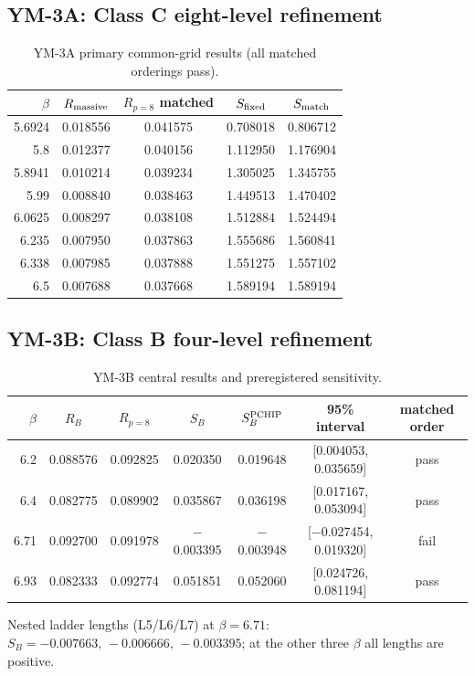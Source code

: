 \documentclass[11pt,a4paper]{article}
\theoremstyle{definition}
\theoremstyle{remark}
\begin{document}
\subsection{YM-3A: Class C eight-level refinement}
\begin{table}[ht]\centering\small\caption{YM-3A primary common-grid results (all matched orderings pass).}\label{tab:ym3a}
\begin{tabular}{@{}rcccc@{}}\toprule $\beta$ & $R_{\rm massive}$ & $R_{p=8}$ matched & $S_{\rm fixed}$ & $S_{\rm match}$\\\midrule
5.6924 & 0.018556 & 0.041575 & 0.708018 & 0.806712\\
5.8 & 0.012377 & 0.040156 & 1.112950 & 1.176904\\
5.8941 & 0.010214 & 0.039234 & 1.305025 & 1.345755\\
5.99 & 0.008840 & 0.038463 & 1.449513 & 1.470402\\
6.0625 & 0.008297 & 0.038108 & 1.512884 & 1.524494\\
6.235 & 0.007950 & 0.037863 & 1.555686 & 1.560841\\
6.338 & 0.007985 & 0.037888 & 1.551275 & 1.557102\\
6.5 & 0.007688 & 0.037668 & 1.589194 & 1.589194\\
\bottomrule\end{tabular}\end{table}
\subsection{YM-3B: Class B four-level refinement}
\begin{table}[ht]\centering\small\caption{YM-3B central results and preregistered sensitivity.}\label{tab:ym3b}
\begin{tabular}{@{}rcccccc@{}}\toprule $\beta$ & $R_B$ & $R_{p=8}$ & $S_B$ & $S_B^{\rm PCHIP}$ & 95\% interval & matched order\\\midrule
6.2 & 0.088576 & 0.092825 & 0.020350 & 0.019648 & [0.004053, 0.035659] & pass\\
6.4 & 0.082775 & 0.089902 & 0.035867 & 0.036198 & [0.017167, 0.053094] & pass\\
6.71 & 0.092700 & 0.091978 & $-$0.003395 & $-$0.003948 & [$-$0.027454, 0.019320] & fail\\
6.93 & 0.082333 & 0.092774 & 0.051851 & 0.052060 & [0.024726, 0.081194] & pass\\
\bottomrule\end{tabular}\end{table}
\noindent Nested ladder lengths (L5/L6/L7) at $\beta=6.71$: $S_B=-0.007663,\,-0.006666,\,-0.003395$; at the other three $\beta$ all lengths are positive.
\end{document}
